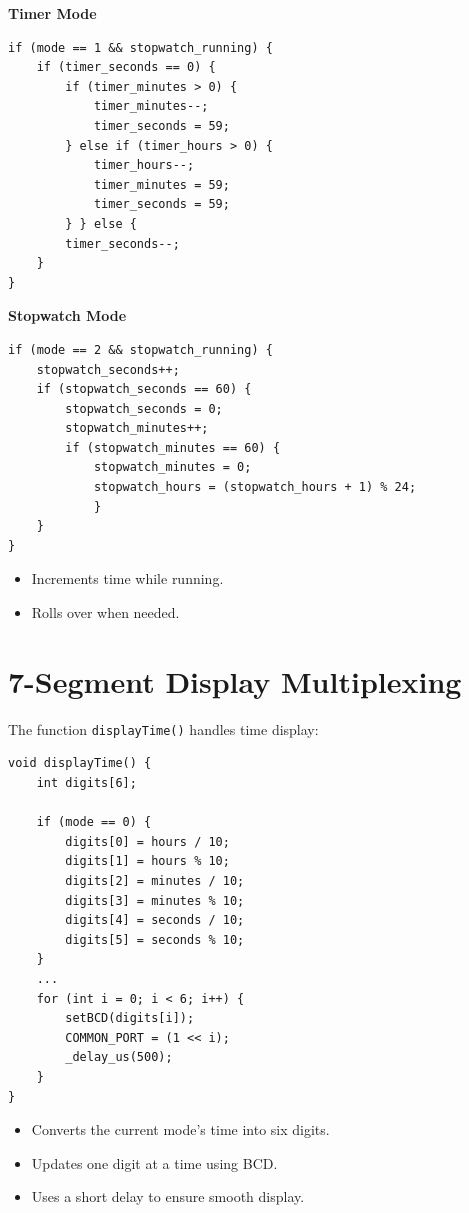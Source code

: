 \documentclass[a4paper,12pt]{article}
\begin{document}
\textbf{Timer Mode}

\begin{lstlisting}
if (mode == 1 && stopwatch_running) {  
    if (timer_seconds == 0) {
        if (timer_minutes > 0) {
            timer_minutes--;
            timer_seconds = 59;
        } else if (timer_hours > 0) {
            timer_hours--;
            timer_minutes = 59;
            timer_seconds = 59;
        } } else {
        timer_seconds--;
    }
}
\end{lstlisting}

\textbf{Stopwatch Mode}

\begin{lstlisting}
if (mode == 2 && stopwatch_running) {
    stopwatch_seconds++;
    if (stopwatch_seconds == 60) {
        stopwatch_seconds = 0;
        stopwatch_minutes++;
        if (stopwatch_minutes == 60) {
            stopwatch_minutes = 0;
            stopwatch_hours = (stopwatch_hours + 1) % 24;
            }
    }
}
\end{lstlisting}

\begin{itemize}
    \item Increments time while running.
    \item Rolls over when needed.
\end{itemize}

\section*{7-Segment Display Multiplexing}
The function \texttt{displayTime()} handles time display:

\begin{lstlisting}
void displayTime() {
    int digits[6];

    if (mode == 0) { 
        digits[0] = hours / 10;
        digits[1] = hours % 10;
        digits[2] = minutes / 10;
        digits[3] = minutes % 10;
        digits[4] = seconds / 10;
        digits[5] = seconds % 10;
    }
    ...
    for (int i = 0; i < 6; i++) {
        setBCD(digits[i]); 
        COMMON_PORT = (1 << i); 
        _delay_us(500);
    }
}
\end{lstlisting}

\begin{itemize}
    \item Converts the current mode's time into six digits.
    \item Updates one digit at a time using BCD.
    \item Uses a short delay to ensure smooth display.
\end{itemize}
\end{document}
